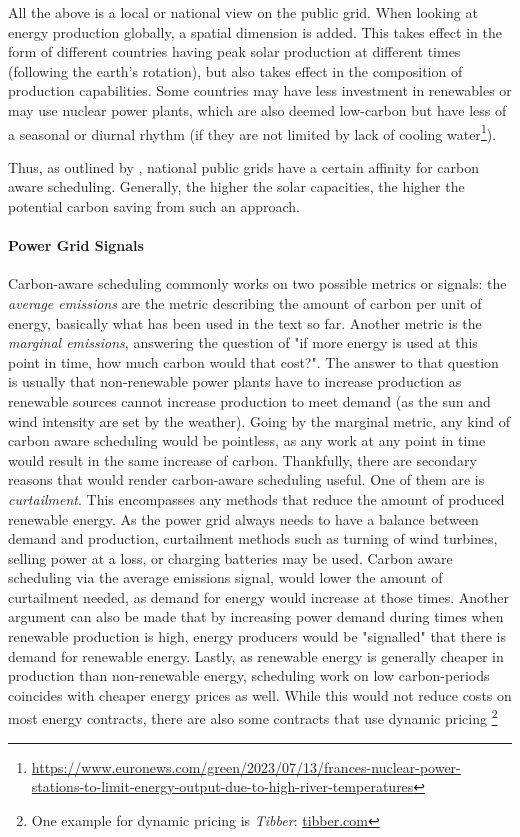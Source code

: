 All the above is a local or national view on the public grid. 
When looking at energy production globally, a spatial dimension is added. 
This takes effect in the form of different countries having peak solar production at different times (following the earth's rotation), but also takes effect in the composition of production capabilities.
Some countries may have less investment in renewables or may use nuclear power plants, which are also deemed low-carbon but have less of a seasonal or diurnal rhythm (if they are not limited by lack of cooling water\footnote{\url{https://www.euronews.com/green/2023/07/13/frances-nuclear-power-stations-to-limit-energy-output-due-to-high-river-temperatures}}).

Thus, as outlined by \cite{wiesner_lets_2021}, national public grids have a certain affinity for carbon aware scheduling. Generally, the higher the solar capacities, the higher the potential carbon saving from such an approach. 

\paragraph{Power Grid Signals}
Carbon-aware scheduling commonly works on two possible metrics or signals: the \emph{average emissions} are the metric describing the amount of carbon per unit of energy, basically what has been used in the text so far. Another metric is the \emph{marginal emissions}, answering the question of "if more energy is used at this point in time, how much carbon would that cost?". 
The answer to that question is usually that non-renewable power plants have to increase production as renewable sources cannot increase production to meet demand (as the sun and wind intensity are set by the weather). 
Going by the marginal metric, any kind of carbon aware scheduling would be pointless, as any work at any point in time would result in the same increase of carbon. 
Thankfully, there are secondary reasons that would render carbon-aware scheduling useful. One of them are is \emph{curtailment}. 
This encompasses any methods that reduce the amount of produced renewable energy. As the power grid always needs to have a balance between demand and production, curtailment methods such as turning of wind turbines, selling power at a loss, or charging batteries may be used. 
Carbon aware scheduling via the average emissions signal, would lower the amount of curtailment needed, as demand for energy would increase at those times.
Another argument can also be made that by increasing power demand during times when renewable production is high, energy producers would be "signalled" that there is demand for renewable energy.
Lastly, as renewable energy is generally cheaper in production than non-renewable energy, scheduling work on low carbon-periods coincides with cheaper energy prices as well. While this would not reduce costs on most energy contracts, there are also some contracts that use dynamic pricing \footnote{One example for dynamic pricing is \emph{Tibber}: \url{tibber.com}}

